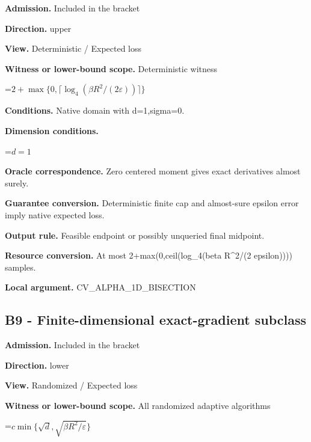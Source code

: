 \documentclass[10pt,a4paper]{article}
\newcommand{\AtlasMath}[1]{\par\begingroup\centering\setbox0=\hbox{$\displaystyle #1$}\ifdim\wd0>1.4\linewidth\typeout{ATLAS WIDE FORMULA: \the\wd0}\fi\ifdim\wd0>\linewidth\resizebox{\linewidth}{!}{\box0}\else\box0\fi\par\endgroup}
\begin{document}
\textbf{Admission.} Included in the bracket



\textbf{Direction.} upper



\textbf{View.} Deterministic / Expected loss



\textbf{Witness or lower-bound scope.} Deterministic witness



\AtlasMath{2+\max\{0,\lceil\log_4(\beta R^2/(2\varepsilon))\rceil\}}


\textbf{Conditions.} Native domain with d=1,sigma=0.



\textbf{Dimension conditions.}



\AtlasMath{d=1}


\textbf{Oracle correspondence.} Zero centered moment gives exact derivatives almost surely.



\textbf{Guarantee conversion.} Deterministic finite cap and almost-sure epsilon error imply native expected loss.



\textbf{Output rule.} Feasible endpoint or possibly unqueried final midpoint.



\textbf{Resource conversion.} At most 2+max(0,ceil(log\_4(beta R\textasciicircum{}2/(2 epsilon)))) samples.



\textbf{Local argument.} CV\_ALPHA\_1D\_BISECTION



\subsection{B9 - Finite-dimensional exact-gradient subclass}


\textbf{Admission.} Included in the bracket



\textbf{Direction.} lower



\textbf{View.} Randomized / Expected loss



\textbf{Witness or lower-bound scope.} All randomized adaptive algorithms



\AtlasMath{c\min\{\sqrt d,\sqrt{\beta R^2/\varepsilon}\}}
\end{document}
